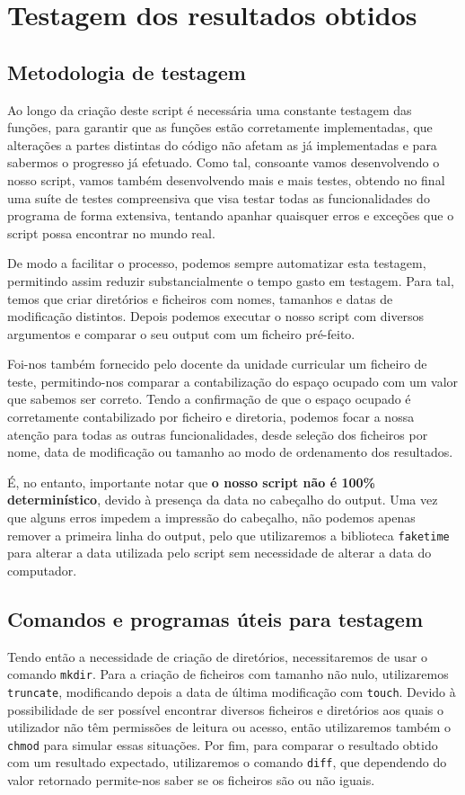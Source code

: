\chapter{Testagem dos resultados obtidos}
\section{Metodologia de testagem}
Ao longo da criação deste script é necessária uma constante
testagem das funções, para garantir que as funções estão
corretamente implementadas, que alterações a partes
distintas do código não afetam as já implementadas e para
sabermos o progresso já efetuado. Como tal, consoante vamos
desenvolvendo o nosso script, vamos também desenvolvendo mais e
mais testes, obtendo no final uma suíte de testes compreensiva
que visa testar todas as funcionalidades do programa de forma
extensiva, tentando apanhar quaisquer erros e exceções que o
script possa encontrar no mundo real.

De modo a facilitar o processo, podemos
sempre automatizar esta testagem, permitindo assim reduzir
substancialmente o tempo gasto em testagem.
Para tal, temos que criar diretórios e ficheiros com nomes,
tamanhos e datas de modificação distintos. Depois podemos
executar o nosso script com diversos argumentos e comparar o
seu output com um ficheiro pré-feito.

Foi-nos também fornecido pelo docente da unidade
curricular um ficheiro de teste, permitindo-nos comparar a 
contabilização do espaço ocupado com um valor que sabemos ser 
correto. Tendo a confirmação de que o espaço ocupado é
corretamente contabilizado por ficheiro e diretoria, podemos
focar a nossa atenção para todas as outras funcionalidades,
desde seleção dos ficheiros por nome, data de modificação ou
tamanho ao modo de ordenamento dos resultados.

É, no entanto, importante notar que \textbf{o nosso script não é 100\%
determinístico}, devido à presença da data no cabeçalho do
output. Uma vez que alguns erros impedem a impressão do
cabeçalho, não podemos apenas remover a primeira linha do
output, pelo que utilizaremos a biblioteca \verb|faketime| para
alterar a data utilizada pelo script sem necessidade de alterar
a data do computador.

\section{Comandos e programas úteis para testagem}
Tendo então a necessidade de criação de diretórios,
necessitaremos de usar o comando \verb|mkdir|. Para a
criação de ficheiros com tamanho não nulo,
utilizaremos \verb|truncate|, modificando depois a data de
última modificação com \verb|touch|. Devido à possibilidade de
ser possível encontrar diversos ficheiros e diretórios aos
quais o utilizador não têm permissões de leitura ou acesso,
então utilizaremos também o \verb|chmod| para simular essas
situações. Por fim, para comparar o resultado obtido com um 
resultado expectado, utilizaremos o comando \verb|diff|, 
que dependendo do valor retornado permite-nos saber se os
ficheiros são ou não iguais.

